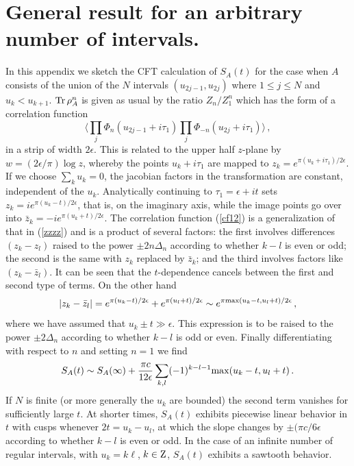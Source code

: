 \documentclass[12pt,preprint,tighten,eqsecnum,aps,floats,psfig,epsfig,amsmath,onecolumn]{revtex4-1}
\def\e{\epsilon}
\begin{document}
{\section{General result for an arbitrary number of intervals.} 
\label{slitapp}

In this appendix we sketch the CFT calculation of
$S_A(t)$ for the case when $A$ consists of the union of the $N$
intervals $(u_{2j-1},u_{2j})$ where $1\leq j\leq N$ and
$u_k<u_{k+1}$. ${\rm Tr}\,\rho_A^n$ is given as usual by the ratio
$Z_n/Z_1^n$ which has the form of a correlation function
\begin{equation}
\label{cf12}
\langle\prod_j\Phi_n(u_{2j-1}+i\tau_1)
\prod_j\Phi_{-n}(u_{2j}+i\tau_1)\rangle\,,
\end{equation}
in a strip of width $2\epsilon$. This is related to the upper half
$z$-plane by $w=(2\epsilon/\pi)\log z$, whereby the points
$u_k+i\tau_1$ are mapped to $z_k=e^{\pi(u_k+i\tau_1)/2\epsilon}$.
If we choose $\sum_ku_k=0$, the jacobian factors in the
transformation are constant, independent of the $u_k$.
Analytically continuing to $\tau_1=\epsilon+it$ sets
$z_k=ie^{\pi(u_k-t)/2\epsilon}$, that is, on the imaginary axis,
while the image points go over into $\bar
z_k=-ie^{\pi(u_k+t)/2\epsilon}$. The correlation function
(\ref{cf12}) is a generalization of that in (\ref{zzzz}) and is a
product of several factors: the first involves differences
$(z_k-z_l)$ raised to the power $\pm 2n\Delta_n$ according to
whether $k-l$ is even or odd; the second is the same with $z_k$
replaced by $\bar z_k$; and the third involves factors like
$(z_k-\bar z_l)$. It can be seen that the $t$-dependence cancels
between the first and second type of terms. On the other hand
\begin{equation}
|z_k-\bar z_l|=e^{\pi(u_k-t)/2\epsilon}+ e^{\pi(u_l+t)/2\epsilon}
\sim e^{\pi{\rm max}(u_k-t,u_l+t)/2\epsilon}\,,
\end{equation}
where we have assumed that $u_k\pm t\gg\epsilon$. This expression
is to be raised to the power $\pm 2\Delta_n$ according to whether
$k-l$ is odd or even. Finally differentiating with respect to $n$
and setting $n=1$ we find
\begin{equation}
S_A(t)\sim S_A(\infty) +\frac{\pi c}{12\e}
\sum_{k,l}(-1)^{k-l-1}{\rm max}(u_k-t,u_l+t)\,.
\end{equation}
If $N$ is finite (or more generally the $u_k$ are bounded) the
second term vanishes for sufficiently large $t$. At shorter times,
$S_A(t)$ exhibits piecewise linear behavior in $t$ with cusps
whenever $2t=u_k-u_l$, at which the slope changes by $\pm(\pi
c/6\epsilon$ according to whether $k-l$ is even or odd. In the
case of an infinite number of regular intervals, with $u_k=k\ell$,
$k\in{\rm Z}$, $S_A(t)$ exhibits a sawtooth behavior.



}
\end{document}
